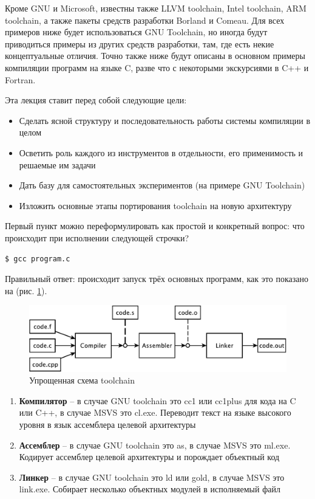 \documentclass[a4paper,12pt,oneside]{article}
\begin{document}
Кроме GNU и Microsoft, известны также LLVM toolchain, Intel toolchain, ARM toolchain, а также пакеты средств разработки Borland и Comeau. Для всех примеров ниже будет использоваться GNU Toolchain, но иногда будут приводиться примеры из других средств разработки, там, где есть некие концептуальные отличия. Точно также ниже будут описаны в основном примеры компиляции программ на языке C, разве что с некоторыми экскурсиями в C++ и Fortran.

Эта лекция ставит перед собой следующие цели:

\begin{itemize}
\item Сделать ясной структуру и последовательность работы системы компиляции в целом
\item Осветить роль каждого из инструментов в отдельности, его применимость и решаемые им задачи
\item Дать базу для самостоятельных экспериментов (на примере GNU Toolchain)
\item Изложить основные этапы портирования toolchain на новую архитектуру
\end{itemize}

Первый пункт можно переформулировать как простой и конкретный вопрос: что происходит при исполнении следующей строчки?

\begin{verbatim}
$ gcc program.c
\end{verbatim}

Правильный ответ: происходит запуск трёх основных программ, как это показано на (рис. \ref{fig:simplified_scheme}).

\begin{figure}[ht]
\centering
\includegraphics[width=1.0\textwidth]{illustrations/simplified-scheme-crop.pdf}
\caption{Упрощенная схема toolchain}
\label{fig:simplified_scheme}
\end{figure}

\begin{enumerate}
\item \textbf{Компилятор} -- в случае GNU toolchain это cc1 или cc1plus для кода на C или C++, в случае MSVS это cl.exe. Переводит текст на языке высокого уровня в язык ассемблера целевой архитектуры
\item \textbf{Ассемблер} -- в случае GNU toolchain это as, в случае MSVS это ml.exe. Кодирует ассемблер целевой архитектуры и порождает объектный код
\item \textbf{Линкер} -- в случае GNU toolchain это ld или gold, в случае MSVS это link.exe. Собирает несколько объектных модулей в исполняемый файл
\end{enumerate}
\end{document}
